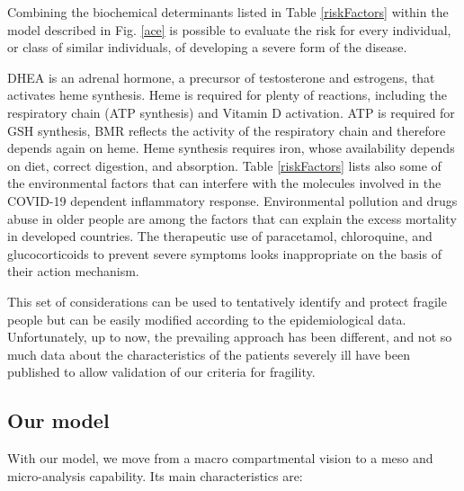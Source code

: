 \documentclass[graybox]{svmult}
\begin{document}
Combining the biochemical determinants listed in Table \ref{riskFactors} within the model described in Fig. \ref{ace} is possible to evaluate the risk for every individual, or class of similar individuals, of developing a severe form of the disease.

DHEA is an adrenal hormone, a precursor of testosterone and estrogens, that activates heme synthesis. Heme is required for plenty of reactions, including the respiratory chain (ATP synthesis) and Vitamin D activation. ATP is required for GSH synthesis, BMR reflects the activity of the respiratory chain and therefore depends again on heme. Heme synthesis requires iron, whose availability depends on diet, correct digestion, and absorption. 
Table \ref{riskFactors} lists also some of the environmental factors that can interfere with the molecules involved in the COVID-19 dependent inflammatory response.
Environmental pollution and drugs abuse in older people are among the factors that can explain the excess mortality in developed countries.
The therapeutic use of paracetamol, chloroquine, and glucocorticoids to prevent severe symptoms looks inappropriate on the basis of their action mechanism.

This set of considerations can be used to tentatively identify and protect fragile people but can be easily modified according to the epidemiological data. Unfortunately, up to now, the prevailing approach has been different, and not so much data about the characteristics of the patients severely ill have been published to allow validation of our criteria for fragility.



\subsection{Our model}
\label{ourModel}

With our model, we move from a macro compartmental vision to a meso and micro-analysis capability. Its main characteristics are:
\end{document}
